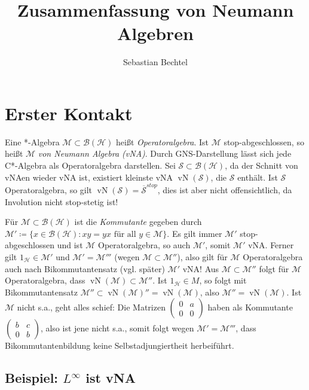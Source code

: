 \documentclass[11pt,a4paper]{scrartcl}
\newcommand{\Hc}{\mathcal{H}}
\newcommand{\Sc}{\mathcal{S}}
\newcommand{\B}{\mathcal{B}}
\newcommand{\M}{\mathcal{M}}
\theoremstyle{plain}
\theoremstyle{definition}
\theoremstyle{remark}
\DeclareMathOperator{\vN}{vN}
\begin{document}
\title{Zusammenfassung von Neumann Algebren}
\author{Sebastian Bechtel}
\maketitle

\section{Erster Kontakt}

Eine *-Algebra $\M \subset \B(\Hc)$ heißt \emph{Operatoralgebra}. Ist $\M$ stop-abgeschlossen, so heißt $\M$ \emph{von Neumann Algebra (vNA)}. Durch GNS-Darstellung lässt sich jede C*-Algebra als Operatoralgebra darstellen. Sei $\Sc \subset \B(\Hc)$, da der Schnitt von vNAen wieder vNA ist, existiert kleinste vNA $\vN(\Sc)$, die $\Sc$ enthält. Ist $\Sc$ Operatoralgebra, so gilt $\vN(\Sc)=\overline{\Sc}^{stop}$, dies ist aber nicht offensichtlich, da Involution nicht stop-stetig ist!

Für $\M \subset \B(\Hc)$ ist die \emph{Kommutante} gegeben durch $\M'\coloneqq \{ x\in\B(\Hc): xy=yx \text{ für all } y\in \M \}$. Es gilt immer $\M'$ stop-abgeschlossen und ist $\M$ Operatoralgebra, so auch $\M'$, somit $\M'$ vNA. Ferner gilt $1_\Hc\in \M'$ und $\M'=\M'''$ (wegen $\M\subset \M''$), also gilt für $\M$ Operatoralgebra auch nach Bikommutantensatz (vgl. später) $\M'$ vNA! Aus $\M \subset \M''$ folgt für $\M$ Operatoralgebra, dass $\vN(\M)\subset \M''$. Ist $1_\Hc\in M$, so folgt mit Bikommutantensatz $\M''\subset \vN(\M)''=\vN(\M)$, also $\M''=\vN(\M)$. Ist $\M$ nicht s.a., geht alles schief: Die Matrizen $\left(\begin{smallmatrix} 0 & a \\ 0 & 0 \end{smallmatrix}\right)$ haben als Kommutante $\left(\begin{smallmatrix} b & c \\ 0 & b \end{smallmatrix}\right)$, also ist jene nicht s.a., somit folgt wegen $\M'=\M'''$, dass Bikommutantenbildung keine Selbstadjungiertheit herbeiführt.

\subsection{Beispiel: $L^\infty$ ist vNA}
\end{document}
